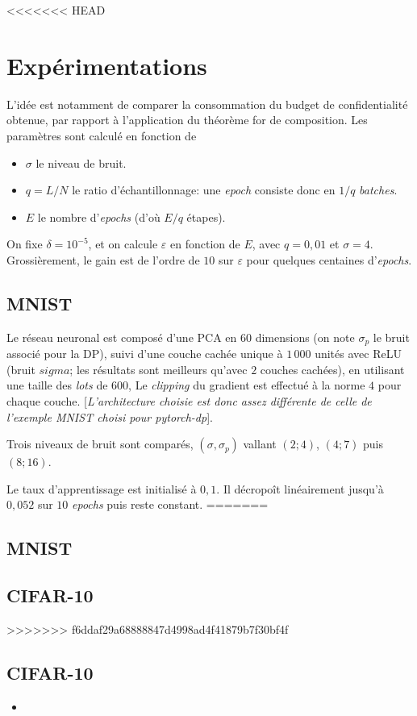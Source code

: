 \documentclass[a4paper,11pt]{article} %
\begin{document}
<<<<<<< HEAD

\section{Expérimentations}
L'idée est notamment de comparer la consommation du budget de confidentialité obtenue, par rapport à l'application du théorème for de composition. Les paramètres sont calculé en fonction de
\begin{itemize}
    \item
    $\sigma$ le niveau de bruit.
    \item
    $q=L/N$ le ratio d'échantillonnage: une \emph{epoch} consiste donc en $1/q$ \emph{batches}.
    \item
    $E$ le nombre d'\emph{epochs} (d'où $E/q$ étapes).
\end{itemize}
On fixe $\delta = 10^{-5}$, et on calcule $\varepsilon$ en fonction de $E$, avec $q=0,01$ et $\sigma = 4$. Grossièrement, le gain est de l'ordre de $10$ sur $\varepsilon$ pour quelques centaines d'\emph{epochs}.
%
\subsection{MNIST}
%
Le réseau neuronal est composé d'une PCA en $60$ dimensions (on note $\sigma_p$ le bruit associé pour la DP), suivi d'une couche cachée unique à $1\,000$ unités avec ReLU (bruit $sigma$; les résultats sont meilleurs qu'avec $2$ couches cachées), en utilisant une taille des \emph{lots} de $600$, Le \emph{clipping} du gradient est effectué à la norme $4$ pour chaque couche. [\emph{L'architecture choisie est donc assez différente de celle de l'exemple MNIST choisi pour pytorch-dp}].

Trois niveaux de bruit sont comparés, $(\sigma, \sigma_p)$ vallant $(2; 4)$, $(4; 7)$ puis $(8; 16)$.

Le taux d'apprentissage est initialisé à $0,1$. Il décropoît linéairement jusqu'à $0,052$ sur $10$ \emph{epochs} puis reste constant.
=======
\subsection{MNIST}


\subsection{CIFAR-10}
>>>>>>> f6ddaf29a68888847d4998ad4f41879b7f30bf4f




%
\subsection{CIFAR-10}
%
%

\begin{itemize}
    \item
\end{itemize}
\end{document}
